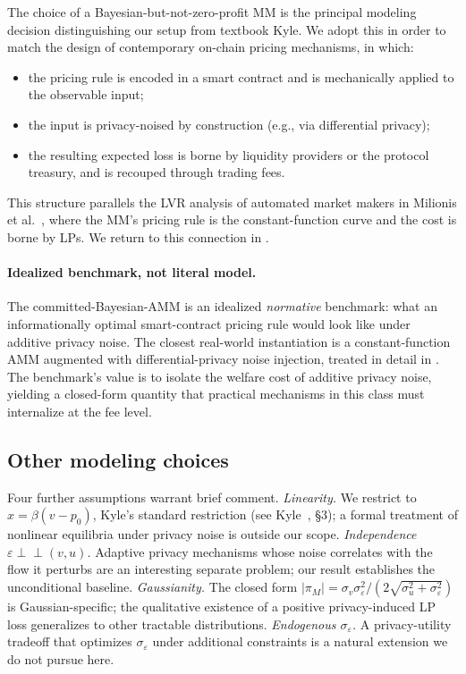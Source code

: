 \documentclass[runningheads]{llncs}
\newcommand{\indep}{\perp\!\!\!\perp}
\newcommand{\sigv}{\sigma_v}
\newcommand{\sigu}{\sigma_u}
\newcommand{\sige}{\sigma_\varepsilon}
\begin{document}
The choice of a Bayesian-but-not-zero-profit MM is the principal
modeling decision distinguishing our setup from textbook Kyle. We
adopt this in order to match the design of contemporary on-chain
pricing mechanisms, in which:
\begin{itemize}[leftmargin=*]
\item the pricing rule is encoded in a smart contract and is
mechanically applied to the observable input;
\item the input is privacy-noised by construction (e.g., via
differential privacy);
\item the resulting expected loss is borne by liquidity providers
or the protocol treasury, and is recouped through trading fees.
\end{itemize}
This structure parallels the LVR analysis of automated market
makers in Milionis et al.~\cite{milionis2022lvr}, where the MM's
pricing rule is the constant-function curve and the cost is borne
by LPs. We return to this connection in .

\paragraph{Idealized benchmark, not literal model.}
The committed-Bayesian-AMM is an idealized \emph{normative}
benchmark: what an informationally optimal smart-contract pricing
rule would look like under additive privacy noise. The closest
real-world instantiation is a constant-function AMM augmented
with differential-privacy noise injection, treated in detail in
. The benchmark's value is to isolate the
welfare cost of additive privacy noise, yielding a closed-form
quantity that practical mechanisms in this class must internalize
at the fee level.

\subsection{Other modeling choices}
\label{ssec:assumptions}

Four further assumptions warrant brief comment. \emph{Linearity.}
We restrict to $x = \beta(v - p_0)$, Kyle's standard restriction
(see Kyle~\cite{kyle1985}, \S3); a formal treatment of nonlinear
equilibria under privacy noise is outside our scope.
\emph{Independence $\varepsilon \indep (v, u)$.} Adaptive privacy
mechanisms whose noise correlates with the flow it perturbs are an
interesting separate problem; our result establishes the
unconditional baseline.
\emph{Gaussianity.} The closed form
$|\pi_M| = \sigv\sige^2/(2\sqrt{\sigu^2 + \sige^2})$ is
Gaussian-specific; the qualitative existence of a positive
privacy-induced LP loss generalizes to other tractable
distributions.
\emph{Endogenous $\sige$.} A privacy-utility tradeoff that
optimizes $\sige$ under additional constraints is a natural
extension we do not pursue here.
\end{document}
